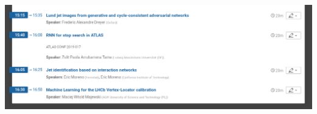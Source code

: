 \begin{frame}
  \begin{columns}
    \begin{column}{.98\textwidth}
      \includegraphics[width=\textwidth]{./agenda.png}
    \end{column}
  \end{columns}
\end{frame}

\appendix
\begin{frame}

  \vspace{.3\textheight}

\end{frame}
